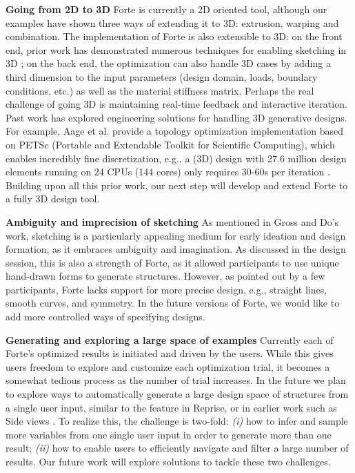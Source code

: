 \textbf{Going from 2D to 3D}
Forte is currently a 2D oriented tool, although our examples have shown three ways of extending it to 3D: extrusion, warping and combination. The implementation of Forte is also extensible to 3D: on the front end, prior work has demonstrated numerous techniques for enabling sketching in 3D \cite{igarashi2007teddy, bae2008ilovesketch, bae2009everybodylovessketch}; on the back end, the optimization can also handle 3D cases by adding a third dimension to the input parameters (design domain, loads, boundary conditions, etc.) as well as the material stiffness matrix. Perhaps the real challenge of going 3D is maintaining real-time feedback and interactive iteration. Past work has explored engineering solutions for handling 3D generative designs. For example, Aage et al. provide a topology optimization implementation based on PETSc (Portable and Extendable Toolkit for Scientific Computing), which enables incredibly fine discretization, e.g., a (3D) design with 27.6 million design elements running on 24 CPUs (144 cores) only requires 30-60s per iteration \cite{aage2014topology}. Building upon all this prior work, our next step will develop and extend Forte to a fully 3D design tool.

\textbf{Ambiguity and imprecision of sketching}
As mentioned in Gross and Do's work, sketching is a particularly appealing medium for early ideation and design formation, as it embraces ambiguity and imagination. As discussed in the design session, this is also a strength of Forte, as it allowed participants to use unique hand-drawn forms to generate structures. However, as pointed out by a few participants, Forte lacks support for more precise design, e.g., straight lines, smooth curves, and symmetry. In the future versions of Forte, we would like to add more controlled ways of specifying designs.

\textbf{Generating and exploring a large space of examples}
Currently each of Forte's optimized results is initiated and driven by the users. While this gives users freedom to explore and customize each optimization trial, it becomes a somewhat tedious process as the number of trial increases. In the future we plan to explore ways to automatically generate a large design space of structures from a single user input, similar to the feature in Reprise, or in earlier work such as Side views \cite{terry2002side}. To realize this, the challenge is two-fold: {\em(i)} how to infer and sample more variables from one single user input in order to generate more than one result; {\em(ii)} how to enable users to efficiently navigate and filter a large number of results. Our future work will explore solutions to tackle these two challenges.

